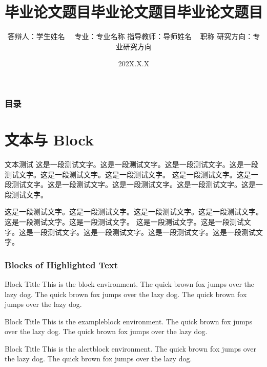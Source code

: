 \documentclass[notheorems,11pt,compress]{beamer}
\title[论文题目]{毕业论文题目毕业论文题目毕业论文题目}
\author[学生姓名]
{
    答辩人：学生姓名~~ \vskip 3mm
    专业：专业名称 \vskip 3mm
    指导教师：导师姓名 ~ 职称 \vskip 3mm
    研究方向：专业研究方向
}
\institute[学校名称]{}
\date[202X.X.X]{202X.X.X}
\numberwithin{figure}{section}
\numberwithin{table}{section}
\numberwithin{equation}{section}
\numberwithin{theorem}{section}
\numberwithin{definition}{section}
\numberwithin{lemma}{section}
\numberwithin{proposition}{section}
\numberwithin{corollary}{section}
\theoremstyle{example}
\begin{document}
\setlength{\baselineskip}{15pt}

\begin{frame}
\titlepage
\end{frame}


\begin{frame}
\frametitle{目录}
  \vskip 10pt
  \hspace*{1.5em}
  \parbox[t]{.95\textwidth}{
  \begin{minipage}[c]{\textwidth}
  \setlength{\baselineskip}{2.8em}
  \tableofcontents
  \end{minipage}
  }
\end{frame}



\section{文本与 Block}

\begin{frame}{文本测试}
这是一段测试文字。这是一段测试文字。这是一段测试文字。这是一段测试文字。这是一段测试文字。这是一段测试文字。
这是一段测试文字。这是一段测试文字。这是一段测试文字。这是一段测试文字。这是一段测试文字。这是一段测试文字。

\vspace{1ex}
这是一段测试文字。这是一段测试文字。这是一段测试文字。这是一段测试文字。这是一段测试文字。这是一段测试文字。
这是一段测试文字。这是一段测试文字。这是一段测试文字。这是一段测试文字。这是一段测试文字。这是一段测试文字。

\end{frame}


\begin{frame}
\frametitle{Blocks of Highlighted Text}
\begin{block}{Block Title}
This is the block environment. The quick brown fox jumps over the lazy dog. The quick brown fox jumps over the lazy dog. The quick brown fox jumps over the lazy dog.
\end{block}

\begin{exampleblock}{Block Title}
This is the exampleblock environment. The quick brown fox jumps over the lazy dog. The quick brown fox jumps over the lazy dog.
\end{exampleblock}

\begin{alertblock}{Block Title}
This is the alertblock environment. The quick brown fox jumps over the lazy dog. The quick brown fox jumps over the lazy dog.
\end{alertblock}
\end{frame}
\end{document}
